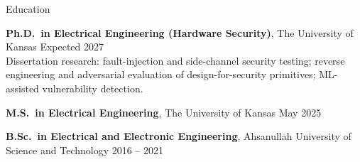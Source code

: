 \begin{rSection}{Education}

{\bfseries Ph.D.\ in Electrical Engineering (Hardware Security)}, The University of Kansas \hfill {\color{muted}\small Expected 2027}\\
{\small Dissertation research: fault-injection and side-channel security testing; reverse engineering and adversarial evaluation of design-for-security primitives; ML-assisted vulnerability detection.}

\smallskip
{\bfseries M.S.\ in Electrical Engineering}, The University of Kansas \hfill {\color{muted}\small May 2025}

\smallskip
{\bfseries B.Sc.\ in Electrical and Electronic Engineering}, Ahsanullah University of Science and Technology \hfill {\color{muted}\small 2016 -- 2021}

\end{rSection}

